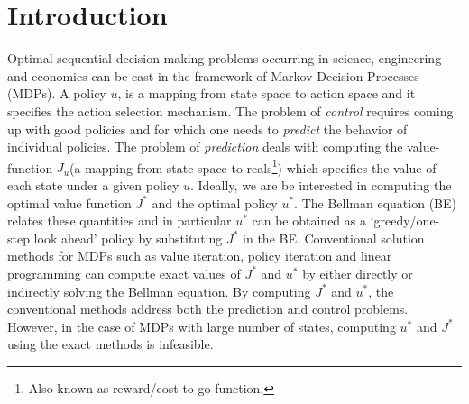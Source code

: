 \section{Introduction}\label{intro}
Optimal sequential decision making problems occurring in science, engineering and economics can be cast in the framework of Markov Decision Processes (MDPs). A policy $u$, is a mapping from state space to action space and it specifies the action selection mechanism. The problem of \emph{control} requires coming up with good policies and for which one needs to \emph{predict} the behavior of individual policies. The problem of \emph{prediction} deals with computing the value-function $J_u$(a mapping from state space to reals\footnote{Also known as reward/cost-to-go function.}) which specifies the value of each state under a given policy $u$. Ideally, we are be interested in computing the optimal value function $J^*$ and the optimal policy $u^*$. The Bellman equation (BE) relates these quantities and in particular $u^*$ can be obtained as a `greedy/one-step look ahead' policy by substituting $J^*$ in the BE. Conventional solution methods for MDPs \cite{BertB} such as value iteration, policy iteration and linear programming can compute exact values of $J^*$ and $u^*$ by either directly or indirectly solving the Bellman equation. By computing $J^*$ and $u^*$, the conventional methods address both the prediction and control problems. However, in the case of MDPs with large number of states, computing $u^*$ and $J^*$ using the exact methods is infeasible. 



